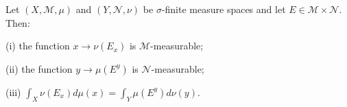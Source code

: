 Let $(X, \mathcal{M}, \mu)$ and $(Y, \mathcal{N}, \nu)$ be $\sigma$-finite measure spaces and let $E \in \mathcal{M} \times \mathcal{N}$. Then:

(i) the function $x \to \nu(E_x)$ is $\mathcal{M}$-measurable;

(ii) the function $y \to \mu(E^y)$ is $\mathcal{N}$-measurable;

(iii) $\int_X \nu(E_x) d\mu(x) = \int_Y \mu(E^y) d\nu(y)$.
